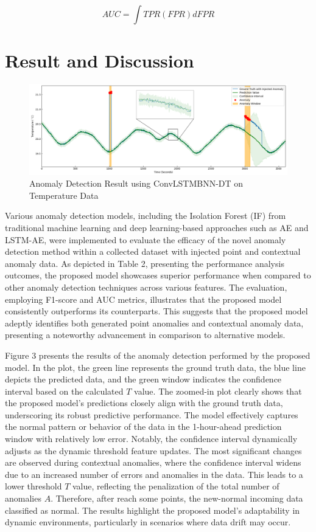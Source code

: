 \documentclass[final,3p,times,twocolumn]{elsarticle}
\begin{document}
\begin{equation}\label{eq4}
AUC = \int TPR(FPR) dFPR
\end{equation}

\section{Result and Discussion}\label{sec4}
\begin{figure}[t]
	\centering
	\includegraphics[width=14cm]{Anomaly} 
	\caption[width=0.5\paperwidth]{Anomaly Detection Result using ConvLSTMBNN-DT on Temperature Data}\label{fig:Anomaly}
\end{figure}

Various anomaly detection models, including the Isolation Forest (IF) from traditional machine learning and deep learning-based approaches such as AE and LSTM-AE, were implemented to evaluate the efficacy of the novel anomaly detection method within a collected dataset with injected point and contextual anomaly data. As depicted in Table 2, presenting the performance analysis outcomes, the proposed model showcases superior performance when compared to other anomaly detection techniques across various features. The evaluation, employing F1-score and AUC metrics, illustrates that the proposed model consistently outperforms its counterparts. This suggests that the proposed model adeptly identifies both generated point anomalies and contextual anomaly data, presenting a noteworthy advancement in comparison to alternative models.

Figure 3 presents the results of the anomaly detection performed by the proposed model. In the plot, the green line represents the ground truth data, the blue line depicts the predicted data, and the green window indicates the confidence interval based on the calculated $T$ value. The zoomed-in plot clearly shows that the proposed model's predictions closely align with the ground truth data, underscoring its robust predictive performance. The model effectively captures the normal pattern or behavior of the data in the 1-hour-ahead prediction window with relatively low error. Notably, the confidence interval dynamically adjusts as the dynamic threshold feature updates. The most significant changes are observed during contextual anomalies, where the confidence interval widens due to an increased number of errors and anomalies in the data. This leads to a lower threshold $T$ value, reflecting the penalization of the total number of anomalies $A$. Therefore, after reach some points, the new-normal incoming data classified as normal.  The results highlight the proposed model's adaptability in dynamic environments, particularly in scenarios where data drift may occur.
\end{document}
